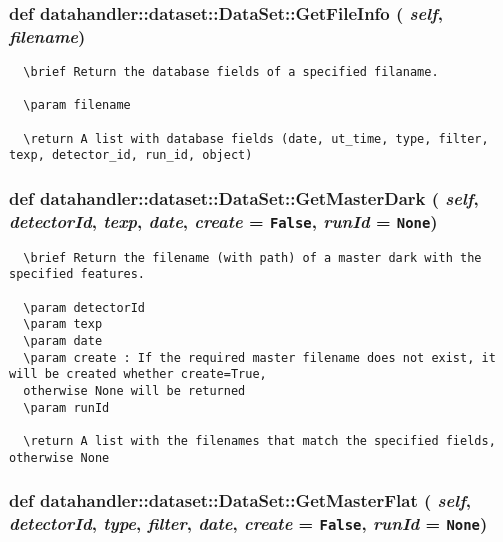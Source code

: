 \subsubsection{\setlength{\rightskip}{0pt plus 5cm}def datahandler::dataset::Data\-Set::Get\-File\-Info ( {\em self},  {\em filename})}\label{classdatahandler_1_1dataset_1_1DataSet_c5513721da7a51440607121bd745a312}




\footnotesize\begin{verbatim}
  \brief Return the database fields of a specified filaname.

  \param filename

  \return A list with database fields (date, ut_time, type, filter, texp, detector_id, run_id, object)
\end{verbatim}
\normalsize
\subsubsection{\setlength{\rightskip}{0pt plus 5cm}def datahandler::dataset::Data\-Set::Get\-Master\-Dark ( {\em self},  {\em detector\-Id},  {\em texp},  {\em date},  {\em create} = {\tt False},  {\em run\-Id} = {\tt None})}\label{classdatahandler_1_1dataset_1_1DataSet_6b27bb8770989f84d9fabb424a0b541f}




\footnotesize\begin{verbatim}
  \brief Return the filename (with path) of a master dark with the specified features.

  \param detectorId
  \param texp
  \param date
  \param create : If the required master filename does not exist, it will be created whether create=True,
  otherwise None will be returned
  \param runId

  \return A list with the filenames that match the specified fields, otherwise None
\end{verbatim}
\normalsize
\subsubsection{\setlength{\rightskip}{0pt plus 5cm}def datahandler::dataset::Data\-Set::Get\-Master\-Flat ( {\em self},  {\em detector\-Id},  {\em type},  {\em filter},  {\em date},  {\em create} = {\tt False},  {\em run\-Id} = {\tt None})}\label{classdatahandler_1_1dataset_1_1DataSet_5ef3a566dc36582e437288204a9a3a3f}




